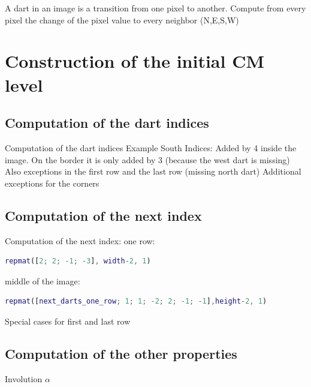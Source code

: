 \documentclass[12pt]{article}
\begin{document}
A dart in an image is a transition from one pixel to
another.
Compute from every pixel the change of the pixel
value to every neighbor (N,E,S,W)


\section{Construction of the initial CM level} %
\label{sec:construction_of_the_initial_cm_level}

\subsection{Computation of the dart indices} %
\label{sub:computation_of_the_dart_indices}

Computation of the dart indices
Example South Indices:
Added by 4 inside the image. On the border it
is only added by 3 (because the west dart is
missing)
Also exceptions in the first row and the last
row (missing north dart)
Additional exceptions for the corners


\subsection{Computation of the next index} %
\label{sub:computation_of_the_next_index}

Computation of the next index:
one row:
\begin{lstlisting}[language=Matlab]
repmat([2; 2; -1; -3], width-2, 1)
\end{lstlisting}
middle of the image:

\begin{lstlisting}[language=Matlab]
repmat([next_darts_one_row; 1; 1; -2; 2; -1; -1],height-2, 1)
\end{lstlisting}

Special cases for first and last row


\subsection{Computation of the other properties} %
\label{sub:computation_of_the_other_properties}

Involution \( \alpha \)
\end{document}
